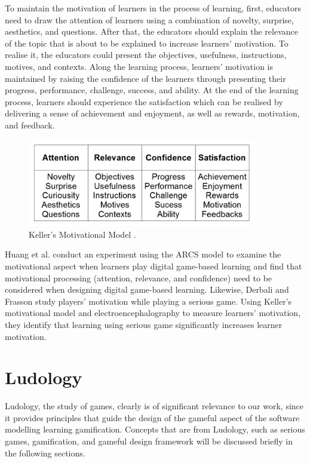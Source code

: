 \documentclass[12pt, a4paper]{report}
\begin{document}
To maintain the motivation of learners in the process of learning, first, educators need to draw the attention of learners using a combination of novelty, surprise, aesthetics, and questions. After that, the educators should explain the relevance of the topic that is about to be explained to increase learners' motivation. To realise it, the educators could present the objectives, usefulness, instructions, motives, and contexts. Along the learning process, learners' motivation is maintained by raising the confidence of the learners through presenting their progress, performance, challenge, success, and ability. At the end of the learning process, learners should experience the satisfaction which can be realised by delivering a sense of achievement and enjoyment, as well as rewards, motivation, and feedback.

\begin{figure}[ht]
\centering
\includegraphics[width=10cm]{keller}
\caption{Keller's Motivational Model \cite{keller2010motivational}.}
\label{keller}
\end{figure}

Huang et al. \cite{huang2010sustaining} conduct an experiment using the ARCS model to examine the motivational aspect when learners play digital game-based learning and find that motivational processing (attention, relevance, and confidence) need to be considered when designing digital game-based learning. Likewise, Derbali and Frasson study players' motivation while playing a serious game. Using Keller's motivational model and electroencephalography to measure learners' motivation, they identify that learning using serious game significantly increases learner motivation. 

\section{Ludology}
Ludology, the study of games, clearly is of significant relevance to our work, since it provides principles that guide the design of the gameful aspect of the software modelling learning gamification. Concepts that are from Ludology, such as serious games, gamification, and gameful design framework \cite{deterding2015lens} will be discussed briefly in the following sections.   
\end{document}
